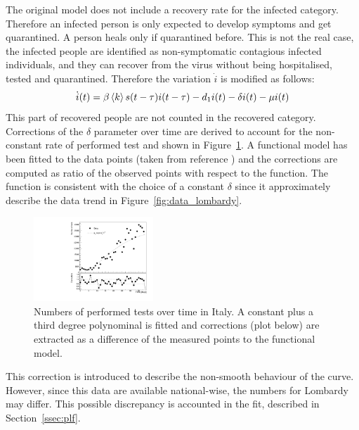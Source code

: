 The original model does not include a recovery rate for the infected category. Therefore an infected person is only expected to develop symptoms and get quarantined. A person heals only if quarantined before. This is not the real case, the infected people are identified as non-symptomatic contagious infected individuals, and they can recover from the virus without being hospitalised, tested and quarantined. Therefore the variation $\dot{i}$ is modified as follows:
\begin{equation}
\dot{i} (t)= \beta\braket{k}s(t-\tau)i(t-\tau) - d_1i(t) - \delta {i(t)} - \mu{i(t)}
\end{equation}
This part of recovered people are not counted in the recovered category.\\

Corrections of the $\delta$ parameter over time are derived to account for the non-constant rate of performed test and shown in Figure~\ref{fig:tests_vs_time}. A functional model has been fitted to the data points (taken from reference \cite{Lab24}) and the corrections are computed as ratio of the observed points with respect to the function. The function is consistent with the choice of a constant $\delta$ since it approximately describe the data trend in Figure~\ref{fig:data_lombardy}.\\

\begin{figure}
\centering
  \includegraphics[width=0.4\textwidth]{imgs/Covid/TamponsCorrections.pdf}
  \caption{Numbers of performed tests over time in Italy. A constant plus a third degree polynominal is fitted and corrections (plot below) are extracted as a difference of the measured points to the functional model.}
  \label{fig:tests_vs_time}
\end{figure}

This correction is introduced to describe the non-smooth behaviour of the curve. However, since this data are available national-wise, the numbers for Lombardy may differ. This possible discrepancy is accounted in the fit, described in Section~\ref{ssec:plf}. \\

